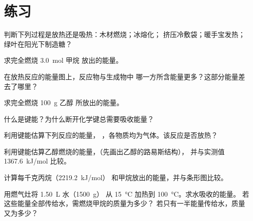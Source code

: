 \section{练习}


\begin{exercise}[$\star$]\label{exo:g11:reaction-energy:1}
判断下列过程是放热还是吸热：木材燃烧；冰熔化；
挤压冷敷袋；暖手宝发热；
绿叶在阳光下制造糖？
\end{exercise}

\begin{exercise}[$\star$]\label{exo:g11:reaction-energy:2}
求完全燃烧 \qty{3.0}{mol} 甲烷
放出的能量。
\end{exercise}

\begin{exercise}[$\star$]\label{exo:g11:reaction-energy:3}
在放热反应的能量图上，反应物与生成物中
哪一方所含能量更多？这部分能量差去了哪里？
\end{exercise}

\begin{exercise}[$\star$]\label{exo:g11:reaction-energy:4}
求完全燃烧 \qty{100}{g} 乙醇
所放出的能量。
\end{exercise}

\begin{exercise}[$\star$]\label{exo:g11:reaction-energy:5}
什么是键能？为什么断开化学键总需要吸收能量？
\end{exercise}

\begin{exercise}[$\star\star$]\label{exo:g11:reaction-energy:6}
利用键能估算下列反应的能量，
，各物质均为气体。该反应是否放热？
\end{exercise}

\begin{exercise}[$\star\star$]\label{exo:g11:reaction-energy:7}
利用键能估算乙醇燃烧的能量，（先画出乙醇的路易斯结构），
并与实测值 \qty{1367.6}{kJ/mol} 比较。
\end{exercise}

\begin{exercise}[$\star\star$]\label{exo:g11:reaction-energy:8}
计算每千克丙烷（\qty{2219.2}{kJ/mol}）
和甲烷放出的能量，并与条形图比较。
\end{exercise}

\begin{exercise}[$\star\star$]\label{exo:g11:reaction-energy:9}
用燃气灶将 \qty{1.50}{L} 水（\qty{1500}{g}）
从 \qty{15}{\celsius} 加热到 \qty{100}{\celsius}。求水吸收的能量。
若这些能量全部传给水，需燃烧甲烷的质量为多少？
若只有一半能量传给水，质量又为多少？
\end{exercise}

